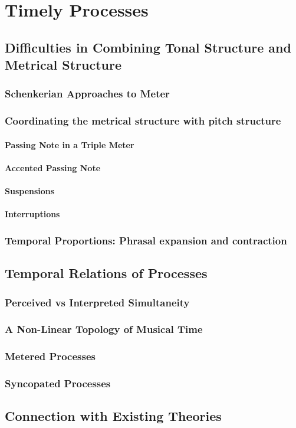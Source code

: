 \chapter{Timely Processes}
    \section{Difficulties in Combining Tonal Structure and Metrical Structure}
        \subsection{Schenkerian Approaches to Meter}
        \subsection{Coordinating the metrical structure with pitch structure}
            \subsubsection{Passing Note in a Triple Meter}
            \subsubsection{Accented Passing Note}
            \subsubsection{Suspensions}
            \subsubsection{Interruptions}
        \subsection{Temporal Proportions: Phrasal expansion and contraction}
        
    \section{Temporal Relations of Processes}
        \subsection{Perceived vs Interpreted Simultaneity}
        \subsection{A Non-Linear Topology of Musical Time}
        \subsection{Metered Processes}
        \subsection{Syncopated Processes}

    \section{Connection with Existing Theories}
